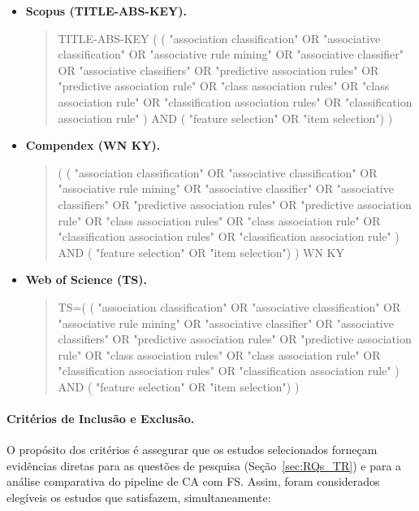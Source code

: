 \begin{itemize}
    \item \textbf{Scopus (TITLE-ABS-KEY).}
    \begin{quote}\footnotesize\ttfamily
    TITLE-ABS-KEY ( ( "association classification" OR "associative classification" OR
    "associative rule mining" OR "associative classifier" OR "associative classifiers" OR
    "predictive association rules" OR "predictive association rule" OR
    "class association rules" OR "class association rule" OR
    "classification association rules" OR "classification association rule" )
    AND ( "feature selection" OR "item selection") )
    \end{quote}

    \item \textbf{Compendex (WN KY).}
    \begin{quote}\footnotesize\ttfamily
    ( ( "association classification" OR "associative classification" OR "associative rule mining" OR
    "associative classifier" OR "associative classifiers" OR "predictive association rules" OR
    "predictive association rule" OR "class association rules" OR "class association rule" OR
    "classification association rules" OR "classification association rule" )
    AND ( "feature selection" OR "item selection") ) WN KY
    \end{quote}

    \item \textbf{Web of Science (TS).}
    \begin{quote}\footnotesize\ttfamily
    TS=( ( "association classification" OR "associative classification" OR "associative rule mining" OR
    "associative classifier" OR "associative classifiers" OR "predictive association rules" OR
    "predictive association rule" OR "class association rules" OR "class association rule" OR
    "classification association rules" OR "classification association rule" )
    AND ( "feature selection" OR "item selection") )
    \end{quote}
\end{itemize}

\paragraph*{Critérios de Inclusão e Exclusão.}
O propósito dos critérios é assegurar que os estudos selecionados forneçam evidências diretas para
as questões de pesquisa (Seção~\ref{sec:RQs_TR}) e para a análise comparativa do pipeline de CA com
FS. Assim, foram considerados elegíveis os estudos que satisfazem, simultaneamente:

